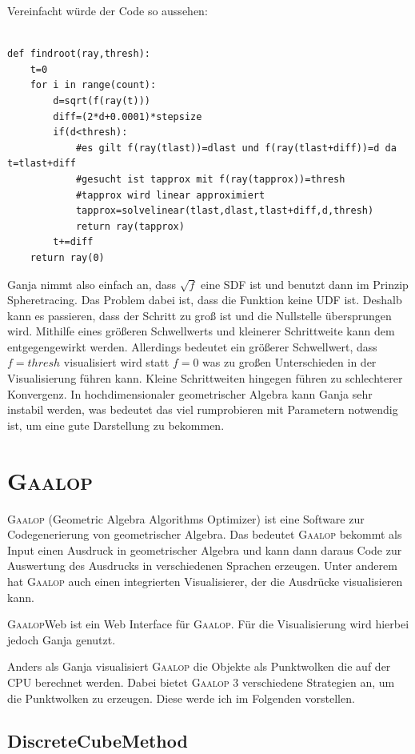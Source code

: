 \documentclass[
	ngerman,%
	accentcolor=9c,%
	ruledheaders=section,%
	class=report,%
	thesis={type=bachelor},%
	fontsize=11pt,%
	parskip=half-,%
	custommargins=true,%
	marginpar=false,%
]{tudapub}
\begin{document}
Vereinfacht würde der Code so aussehen:
\begin{verbatim}

def findroot(ray,thresh):
    t=0
    for i in range(count):
        d=sqrt(f(ray(t)))
        diff=(2*d+0.0001)*stepsize
        if(d<thresh):
            #es gilt f(ray(tlast))=dlast und f(ray(tlast+diff))=d da t=tlast+diff
            #gesucht ist tapprox mit f(ray(tapprox))=thresh
            #tapprox wird linear approximiert
            tapprox=solvelinear(tlast,dlast,tlast+diff,d,thresh)
            return ray(tapprox)
        t+=diff
    return ray(0)
\end{verbatim}

Ganja nimmt also einfach an, dass \(\sqrt{f}\) eine SDF ist und benutzt dann im Prinzip Spheretracing. Das Problem dabei ist, dass die Funktion keine UDF ist. 
Deshalb kann es passieren, dass der Schritt zu groß ist und die Nullstelle übersprungen wird. Mithilfe eines größeren Schwellwerts und kleinerer Schrittweite kann dem entgegengewirkt werden. Allerdings bedeutet ein größerer Schwellwert, dass \(f=thresh\) visualisiert wird statt \(f=0\) was zu großen Unterschieden in der Visualisierung führen kann. Kleine Schrittweiten hingegen führen zu schlechterer Konvergenz. In hochdimensionaler geometrischer Algebra kann Ganja sehr instabil werden, was bedeutet das viel rumprobieren mit Parametern notwendig ist, um eine gute Darstellung zu bekommen.

\section{\textsc{Gaalop}}
\textsc{Gaalop} (Geometric Algebra Algorithms Optimizer) ist eine Software zur Codegenerierung von geometrischer Algebra. Das bedeutet \textsc{Gaalop} bekommt als Input einen Ausdruck in geometrischer Algebra und kann dann daraus Code zur Auswertung des Ausdrucks in verschiedenen Sprachen erzeugen.   
Unter anderem hat \textsc{Gaalop} auch einen integrierten Visualisierer, der die Ausdrücke visualisieren kann.

\textsc{Gaalop}Web ist ein Web Interface für \textsc{Gaalop}. Für die Visualisierung wird hierbei jedoch Ganja genutzt.

Anders als Ganja visualisiert \textsc{Gaalop} die Objekte als Punktwolken die auf der CPU berechnet werden. Dabei bietet \textsc{Gaalop} 3 verschiedene Strategien an, um die Punktwolken zu erzeugen. Diese werde ich im Folgenden vorstellen.

\subsection{DiscreteCubeMethod}
\end{document}
